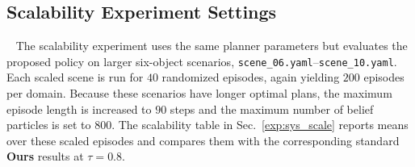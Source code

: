 \subsection{Scalability Experiment Settings}~\label{appx:scale_settings}
The scalability experiment uses the same planner parameters but evaluates the proposed policy on larger six-object scenarios, \texttt{scene\_06.yaml}--\texttt{scene\_10.yaml}. Each scaled scene is run for $40$ randomized episodes, again yielding $200$ episodes per domain. Because these scenarios have longer optimal plans, the maximum episode length is increased to $90$ steps and the maximum number of belief particles is set to $800$. The scalability table in Sec.~\ref{exp:sys_scale} reports means over these scaled episodes and compares them with the corresponding standard \textbf{Ours} results at $\tau=0.8$.
